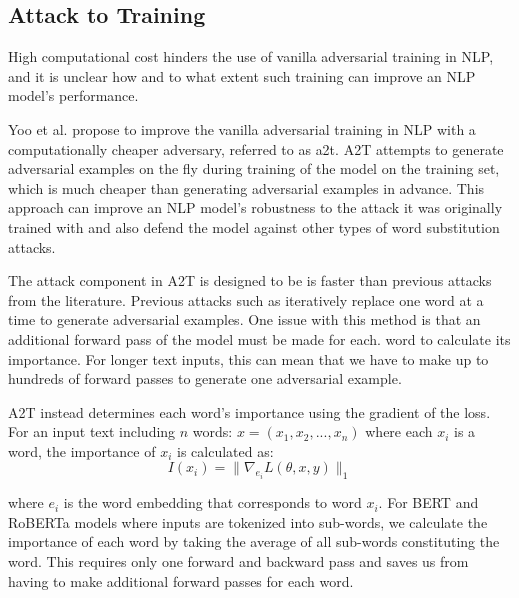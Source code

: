 \subsection{Attack to Training}\label{subsec:a2t}
High computational cost hinders the use of vanilla adversarial training in NLP, and it is unclear how and to what extent such training can improve an NLP model's performance.

Yoo et al. \cite{https://doi.org/10.48550/arxiv.2109.00544} propose to improve the vanilla
adversarial training in NLP with a computationally cheaper adversary, referred to as \acrfull{a2t}. 
A2T attempts to generate adversarial examples on the fly during training of the model on the training set, which is much cheaper than generating adversarial examples in advance.
This approach can improve an NLP model's robustness to the attack it was originally trained with and also defend the model against other types of word substitution attacks.

The attack component in A2T is designed to be is faster than previous attacks from the literature. Previous attacks such as \cite{conf/emnlp/GargR20, journals/corr/abs-1907-11932} iteratively replace one word at a time to generate adversarial examples.
One issue with this method is that an additional
forward pass of the model must be made for each.
word to calculate its importance. For longer text inputs, this can mean that we have to make up to hundreds of forward passes to generate one adversarial example.

A2T instead determines each word's importance
using the gradient of the loss. For an input text including $n$ words: $x = (x_1, x_2, . . . , x_n)$ where each $x_i$ is a word, the importance of $x_i$ is calculated as:
\begin{equation}
    I(x_i) = \| \nabla_{e_i} L(\theta, x, y) \|_1
\end{equation}

where $e_i$ is the word embedding that corresponds to word $x_i$. For BERT and RoBERTa models where inputs are tokenized into sub-words, we calculate the importance of each word by taking the average of all sub-words constituting the word. This requires only one forward and backward
pass and saves us from having to make additional forward passes for each word.
